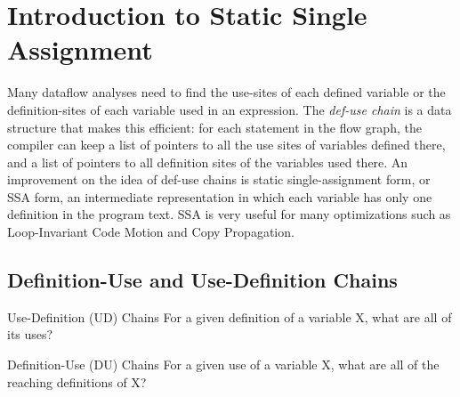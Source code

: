 \newpage

\newpage
\newpage
\newpage

\section{Introduction to Static Single Assignment}

Many dataflow analyses need to find the use-sites of each defined variable or the definition-sites of each variable used in an expression. The \textit{def-use chain} is a data structure that makes this efficient: for each statement in the flow graph, the compiler can keep a list of pointers to all the use sites of variables defined there, and a list of pointers to all definition sites of the variables used there. An improvement on the idea of def-use chains is static single-assignment form, or SSA form, an intermediate representation in which each variable has only one definition in the program text. SSA is very useful for many optimizations such as Loop-Invariant Code Motion and Copy Propagation.



\subsection{Definition-Use and Use-Definition Chains}


\begin{definition}{Use-Definition (UD) Chains}
	For a given definition of a variable X, what are all of its uses?

\end{definition}



\begin{definition}{Definition-Use (DU) Chains}
	For a given use of a variable X, what are all of the reaching definitions of X?

\end{definition}




